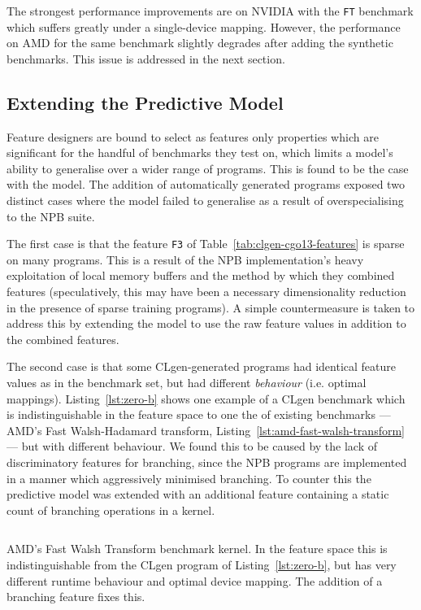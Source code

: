 The strongest performance improvements are on NVIDIA with the \texttt{FT} benchmark which suffers greatly under a single-device mapping. However, the performance on AMD for the same benchmark slightly degrades after adding the synthetic benchmarks. This issue is addressed in the next section.

\subsection{Extending the Predictive Model}
\label{subsec:eval-extended}

Feature designers are bound to select as features only properties which are significant for the handful of benchmarks they test on, which limits a model's ability to generalise over a wider range of programs. This is found to be the case with the \citeauthor{Grewe2013} model. The addition of automatically generated programs exposed two distinct cases where the model failed to generalise as a result of overspecialising to the NPB suite.

The first case is that the feature \texttt{F3} of Table~\ref{tab:clgen-cgo13-features} is sparse on many programs. This is a result of the NPB implementation's heavy exploitation of local memory buffers and the method by which they combined features (speculatively, this may have been a necessary dimensionality reduction in the presence of sparse training programs). A simple countermeasure is taken to address this by extending the model to use the raw feature values in addition to the combined features.

The second case is that some CLgen-generated programs had identical feature values as in the benchmark set, but had different \emph{behaviour} (i.e. optimal mappings). Listing~\ref{lst:zero-b} shows one example of a CLgen benchmark which is indistinguishable in the feature space to one the of existing benchmarks --- AMD's Fast Walsh-Hadamard transform, Listing~\ref{lst:amd-fast-walsh-transform} --- but with different behaviour. We found this to be caused by the lack of discriminatory features for branching, since the NPB programs are implemented in a manner which aggressively minimised branching. To counter this the predictive model was extended with an additional feature containing a static count of branching operations in a kernel.

\begin{listing}
  \inputminted{opencl_lexer.py:OpenCLLexer -x}{lst/amd-fast-walsh-transform.cl}
  \caption[AMD's Fast Walsh Transform kernel]{AMD's Fast Walsh Transform benchmark kernel. In the \citeauthor{Grewe2013} feature space this is indistinguishable from the CLgen program of Listing~\ref{lst:zero-b}, but has very different runtime behaviour and optimal device mapping. The addition of a branching feature fixes this.}
  \label{lst:amd-fast-walsh-transform}
\end{listing}


